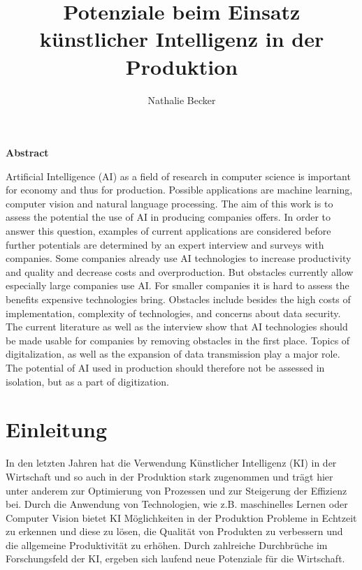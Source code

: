 \documentclass[a4paper,12pt, german]{report}
\begin{document}
\title{Potenziale beim Einsatz künstlicher Intelligenz in der Produktion}
\author{Nathalie Becker}


\begin{titlepage}
\maketitle
\end{titlepage}


\begin{center}
\textbf{Abstract}
\end{center}
Artificial Intelligence (AI) as a field of research in computer science is important for economy and thus for production. Possible applications are machine learning, computer vision and natural language processing. The aim of this work is to assess the potential the use of AI in producing companies offers. In order to answer this question, examples of current applications are considered before further potentials are determined by an expert interview and surveys with companies. Some companies already use AI technologies to increase productivity and quality and decrease costs and overproduction. But obstacles currently allow especially large companies use AI. For smaller companies it is hard to assess the benefits expensive technologies bring. Obstacles include besides the high costs of implementation, complexity of technologies, and concerns about data security. The current literature as well as the interview show that AI technologies should be made usable for companies by removing obstacles in the first place. Topics of digitalization, as well as the expansion of data transmission play a major role. The potential of AI used in production should therefore not be assessed in isolation, but as a part of digitization. 


\tableofcontents

\chapter{Einleitung}

In den letzten Jahren hat die Verwendung Künstlicher Intelligenz (KI) in der Wirtschaft und so auch in der Produktion stark zugenommen und trägt hier unter anderem zur Optimierung von Prozessen und zur Steigerung der Effizienz bei. Durch die Anwendung von Technologien, wie z.B. maschinelles Lernen oder Computer Vision bietet KI Möglichkeiten in der Produktion Probleme in Echtzeit zu erkennen und diese zu lösen, die Qualität von Produkten zu verbessern und die allgemeine Produktivität zu erhöhen. Durch zahlreiche Durchbrüche im Forschungsfeld der KI, ergeben sich laufend neue Potenziale für die Wirtschaft. 
\end{document}
